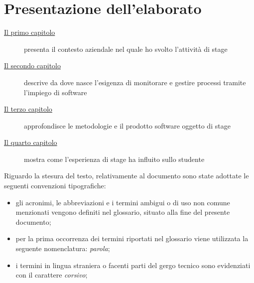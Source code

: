 
\cleardoublepage
{}
{}
\begingroup
\let\clearpage\relax
\let\cleardoublepage\relax
\let\cleardoublepage\relax

\chapter*{Presentazione dell'elaborato}
\begin{description}
    \item[{\hyperref[cap:introduzione]{Il primo capitolo}}] presenta il contesto aziendale nel quale ho svolto l'attività di stage
    \item[{\hyperref[cap:process-mining]{Il secondo capitolo}}] descrive da dove nasce l'esigenza di monitorare e gestire processi tramite l'impiego di software
    
    \item[{\hyperref[cap:modalita-svolgimento]{Il terzo capitolo}}] approfondisce le metodologie e il prodotto software oggetto di stage
    
    \item[{\hyperref[cap:performance-stage]{Il quarto capitolo}}] mostra come l'esperienza di stage ha influito sullo studente
    
\end{description}

Riguardo la stesura del testo, relativamente al documento sono state adottate le seguenti convenzioni tipografiche:
\begin{itemize}
	\item gli acronimi, le abbreviazioni e i termini ambigui o di uso non comune menzionati vengono definiti nel glossario, situato alla fine del presente documento;
	\item per la prima occorrenza dei termini riportati nel glossario viene utilizzata la seguente nomenclatura: \emph{parola}\glsfirstoccur;
	\item i termini in lingua straniera o facenti parti del gergo tecnico sono evidenziati con il carattere \emph{corsivo};
\end{itemize}


%
%

\endgroup			

\vfill

